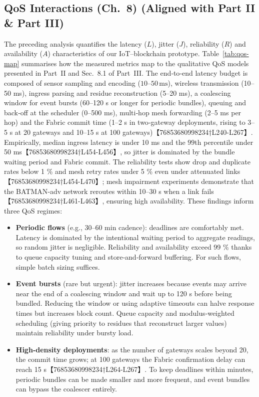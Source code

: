 \documentclass[12pt,onecolumn]{IEEEtran} %
\begin{document}
\subsection{QoS Interactions (Ch.~8) (Aligned with Part II \& Part III)}
\label{subsec:qos-interactions}

The preceding analysis quantifies the latency (\(L\)), jitter (\(J\)), reliability (\(R\)) and availability (\(A\)) characteristics of our IoT–blockchain prototype.  Table~\ref{tab:qos-map} summarises how the measured metrics map to the qualitative QoS models presented in Part~II and Sec.~8.1 of Part~III.  The end‑to‑end latency budget is composed of sensor sampling and encoding (\(10\)–\(50\,\text{ms}\)), wireless transmission (10–50 ms), ingress parsing and residue reconstruction (5–20 ms), a coalescing window for event bursts (60–120 s or longer for periodic bundles), queuing and back‑off at the scheduler (0–500 ms), multi‑hop mesh forwarding (2–5 ms per hop) and the Fabric commit time (1–2 s in two‑gateway deployments, rising to 3–5 s at 20 gateways and 10–15 s at 100 gateways)【76853680998234†L240-L267】.  Empirically, median ingress latency is under 10 ms and the \(99\)th percentile under 50 ms【76853680998234†L454-L456】, so jitter is dominated by the bundle waiting period and Fabric commit.  The reliability tests show drop and duplicate rates below 1 \% and mesh retry rates under 5 \% even under attenuated links【76853680998234†L454-L470】; mesh impairment experiments demonstrate that the BATMAN‑adv network reroutes within 10–30 s when a link fails【76853680998234†L461-L463】, ensuring high availability.  These findings inform three QoS regimes:
\begin{itemize}
  \item \textbf{Periodic flows} (e.g., 30–60 min cadence): deadlines are comfortably met.  Latency is dominated by the intentional waiting period to aggregate readings, so random jitter is negligible.  Reliability and availability exceed 99 \% thanks to queue capacity tuning and store‑and‑forward buffering.  For such flows, simple batch sizing suffices.
  \item \textbf{Event bursts} (rare but urgent): jitter increases because events may arrive near the end of a coalescing window and wait up to 120 s before being bundled.  Reducing the window or using adaptive timeouts can halve response times but increases block count.  Queue capacity and modulus‑weighted scheduling (giving priority to residues that reconstruct larger values) maintain reliability under bursty load.
  \item \textbf{High‑density deployments}: as the number of gateways scales beyond 20, the commit time grows; at 100 gateways the Fabric confirmation delay can reach 15 s【76853680998234†L264-L267】.  To keep deadlines within minutes, periodic bundles can be made smaller and more frequent, and event bundles can bypass the coalescer entirely.
\end{itemize}
\end{document}

